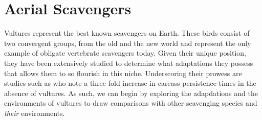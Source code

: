 \documentclass[a4paper,12pt]{article}
\begin{document}
\section*{Aerial Scavengers}

Vultures represent the best known scavengers on Earth. These birds consist of two convergent groups, from the old and the new world and represent the only example of obligate vertebrate scavengers today. Given their unique position, they have been extensively studied to determine what adaptations they possess that allows them to so flourish in this niche. Underscoring their prowess are studies such as \cite{ogada2012effects} who note a three fold increase in carcass persistence times in the absence of vultures. As such, we can begin by exploring the adapdations and the environments of vultures to draw comparisons with other scavenging species and \textit{their} environments. 


\end{document}
